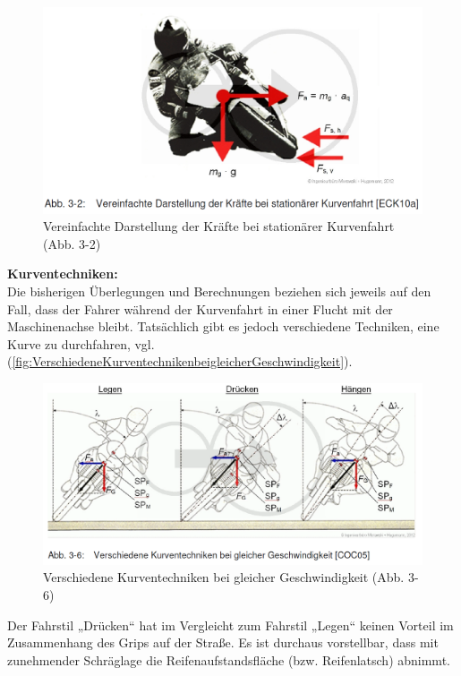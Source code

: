 \begin{figure}[H]
	\centering
	\includegraphics[width=\linewidth]{Bilder/VereinfachteDarstellungDerKraefteBeiStationaererKurvenfahrt.png}
	\caption{Vereinfachte Darstellung der Kräfte bei stationärer Kurvenfahrt (Abb. 3-2)}
	\label{fig:VereinfachteDarstellungDerKraefteBeiStationaererKurvenfahrt}
\end{figure}


\textbf{Kurventechniken:}\\
Die bisherigen Überlegungen und Berechnungen beziehen sich jeweils auf den Fall, dass der Fahrer während der Kurvenfahrt in einer Flucht mit der Maschinenachse bleibt. Tatsächlich gibt es jedoch verschiedene Techniken, eine Kurve zu durchfahren, vgl. (\autoref{fig:VerschiedeneKurventechnikenbeigleicherGeschwindigkeit}).
\begin{figure}[H]
	\centering
	\includegraphics[width=\linewidth]{Bilder/VerschiedeneKurventechnikenbeigleicherGeschwindigkeit.png}
	\caption{Verschiedene Kurventechniken bei gleicher Geschwindigkeit (Abb. 3-6)}
	\label{fig:VerschiedeneKurventechnikenbeigleicherGeschwindigkeit}
\end{figure}

Der Fahrstil „Drücken“ hat im Vergleicht zum Fahrstil „Legen“ keinen Vorteil im Zusammenhang des Grips auf der Straße. Es ist durchaus vorstellbar, dass mit zunehmender Schräglage die Reifenaufstandsfläche (bzw. Reifenlatsch) abnimmt.

